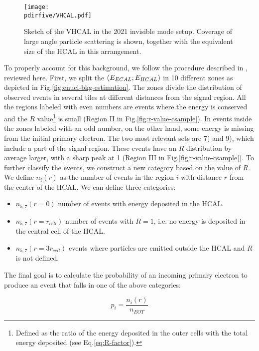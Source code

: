 \begin{figure}[bth!]
  \centering
  \texttt{[image: \\pdirfive/VHCAL.pdf]}
  \caption[Sketch of VHCAL in invisible mode setup 2021]{Sketch of the VHCAL in the 2021 invisible mode setup. Coverage of large angle particle scattering is shown, together with the equivalent size of the HCAL in this arrangement.}
  \label{fig:vhcal}
\end{figure}

To properly account for this background, we follow the procedure described in \cite{na64-neutrals-study,pdegen-thesis}, reviewed here.
First, we split the $(E_{ECAL};E_{HCAL})$ in 10 different zones as depicted in Fig.\ref{fig:enucl-bkg-estimation}. The zones divide the distribution of observed events in several tiles at different distances from the signal region. All the regions labeled with even numbers are events where the energy is conserved and the $R$ value\footnote{Defined as the ratio of the energy deposited in the outer cells with the total energy deposited (see Eq.\ref{eq:R-factor}).} is small (Region II in Fig.\ref{fig:r-value-csample}). In events inside the zones labeled with an odd number, on the other hand, some energy is missing from the initial primary electron. The two most relevant sets are 7) and 9), which include a part of the signal region. These events have an $R$ distribution by average larger, with a sharp peak at 1 (Region III in Fig.\ref{fig:r-value-csample}). To further classify the events, we construct a new category based on the value of $R$. We define $n_i(r)$ as the number of events in the region $i$ with distance $r$ from the center of the HCAL. We can define three categories:

\begin{itemize}
\item $n_{5,7}(r=0)$ number of events with energy deposited in the HCAL.
\item $n_{5,7}(r=r_{cell})$ number of events with $R=1$, i.e. no energy is deposited in the central cell of the HCAL.
\item $n_{5,7}(r=3r_{cell})$ events where particles are emitted outside the HCAL and $R$ is not defined.
\end{itemize}

The final goal is to calculate the probability of an incoming primary electron to produce an event that falls in one of the above categories:

\begin{equation}
  \label{eq:enucl-prob}
  p_i = \frac{n_i(r)}{n_{EOT}}
\end{equation}

